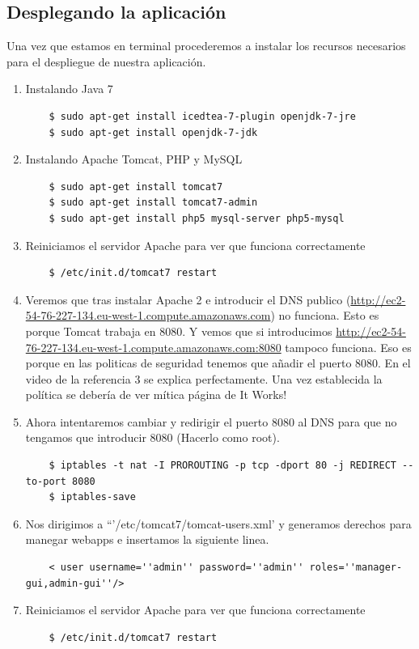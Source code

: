 \documentclass[a4paper,10pt]{scrartcl}
\begin{document}
\subsection{Desplegando la aplicación}
Una vez que estamos en terminal procederemos a instalar los recursos necesarios para el despliegue de nuestra aplicación.	
\begin{enumerate}
	\item Instalando Java 7
	\begin{lstlisting}
	$ sudo apt-get install icedtea-7-plugin openjdk-7-jre
	$ sudo apt-get install openjdk-7-jdk
	\end{lstlisting}
	\item Instalando Apache Tomcat, PHP y MySQL
	\begin{lstlisting}
	$ sudo apt-get install tomcat7
	$ sudo apt-get install tomcat7-admin
	$ sudo apt-get install php5 mysql-server php5-mysql
	\end{lstlisting}
	\item Reiniciamos el servidor Apache para ver que funciona correctamente
	\begin{lstlisting}
	$ /etc/init.d/tomcat7 restart
	\end{lstlisting}		
	\item Veremos que tras instalar Apache 2 e introducir el DNS publico (\url{http://ec2-54-76-227-134.eu-west-1.compute.amazonaws.com}) no funciona. Esto es porque Tomcat trabaja en 8080. Y vemos que si introducimos \url{http://ec2-54-76-227-134.eu-west-1.compute.amazonaws.com:8080} tampoco funciona. Eso es porque en las politicas de seguridad tenemos que añadir el puerto 8080. En el video de la referencia 3 se explica perfectamente. 
	Una vez establecida la política se debería de ver mítica página de It Works!
	\item Ahora intentaremos cambiar y redirigir el puerto 8080 al DNS para que no tengamos que introducir 8080 (Hacerlo como root).
	\begin{lstlisting}
	$ iptables -t nat -I PROROUTING -p tcp -dport 80 -j REDIRECT --to-port 8080
	$ iptables-save
	\end{lstlisting}	
	\item Nos dirigimos a ``'/etc/tomcat7/tomcat-users.xml' y generamos derechos para manegar webapps e insertamos la siguiente linea.
	\begin{lstlisting}
	< user username=''admin'' password=''admin'' roles=''manager-gui,admin-gui''/>
	\end{lstlisting}
	\item Reiniciamos el servidor Apache para ver que funciona correctamente
	\begin{lstlisting}
	$ /etc/init.d/tomcat7 restart
	\end{lstlisting}	
\end{enumerate}
\end{document}
